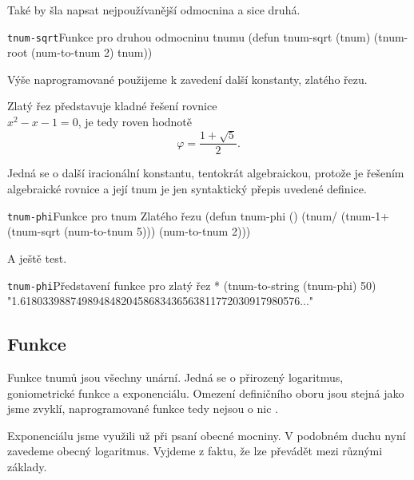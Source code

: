 Také by šla napsat nejpoužívanější odmocnina a sice druhá.

\begin{lispcode}{\texttt{tnum-sqrt}}{Funkce pro druhou odmocninu tnumu}
(\textcolor{funkcionalni}{defun} \textcolor{pojmenovan}{tnum-sqrt} (tnum)
  (\textcolor{moje}{tnum-root} (\textcolor{moje}{num-to-tnum} 2) tnum))
\end{lispcode}

Výše naprogramované použijeme k zavedení další konstanty, zlatého řezu.

\begin{definition}
Zlatý řez představuje kladné řešení rovnice \\$x^2-x-1=0$, je tedy roven hodnotě
\begin{equation}
\varphi=\frac{1+\sqrt{5}}{2}.
\end{equation}
\end{definition}

Jedná se o další iracionální konstantu, tentokrát algebraickou, protože je řešením algebraické rovnice a její tnum je jen syntaktický přepis uvedené definice.

\begin{lispcode}{\texttt{tnum-phi}}{Funkce pro tnum Zlatého řezu}
(\textcolor{funkcionalni}{defun} \textcolor{pojmenovan}{tnum-phi} ()
  (\textcolor{moje}{tnum/} (\textcolor{moje}{tnum-1+} (\textcolor{moje}{tnum-sqrt} (\textcolor{moje}{num-to-tnum} 5))) (\textcolor{moje}{num-to-tnum} 2)))
\end{lispcode}

A ještě test.

\begin{lisptest}{\texttt{tnum-phi}}{Představení funkce pro zlatý řez}
* (tnum-to-string (tnum-phi) 50)
"1.61803398874989484820458683436563811772030917980576..."
\end{lisptest}

\subsection{Funkce}
Funkce tnumů jsou všechny unární. Jedná se o přirozený logaritmus, goniometrické funkce a exponenciálu. Omezení definičního oboru jsou stejná jako jsme zvyklí, naprogramované funkce tedy nejsou o nic .

Exponenciálu jsme využili už při psaní obecné mocniny. V podobném duchu nyní zavedeme obecný logaritmus. Vyjdeme z faktu, že lze převádět mezi různými základy.

